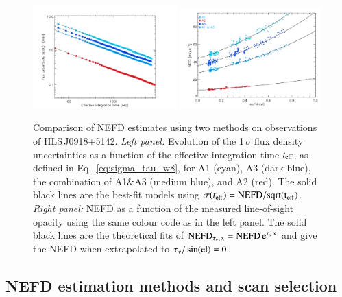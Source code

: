 \documentclass[traditionalabstract]{aa}
\newcommand{\hls}{HLS\,J0918+5142}
\newcommand{\elev}{\rm{el}}
\newcommand{\taunu}{\tau_{\nu}}
\begin{document}
\begin{figure}[!thbp]
  \begin{center}
    \includegraphics[trim={0.5cm, 0, 0, 0.5cm}, clip, angle=0, width=0.495\textwidth]{Figures/hls_nefd_vst-eps-converted-to.pdf}
    \includegraphics[trim={0.5cm, 0, 0.2cm, 0.5cm}, clip, angle=0, width=0.485\textwidth]{Figures/hls_NEFD_vs_TauElev_all-eps-converted-to.pdf}
    \caption{Comparison of NEFD estimates using two methods on observations of
      \hls. \emph{Left panel:} Evolution of the 1\,$\sigma$ flux density
      uncertainties as a function of the effective integration time
      $t_{\rm{eff}}$, as defined in Eq.~\ref{eq:sigma_tau_w8}, for A1
    (cyan), A3 (dark blue), the combination of A1\&A3 (medium blue),
    and A2 (red). The solid black lines are the best-fit models using
    $\sigma(t_{\rm{eff}}) =  \rm{NEFD}/sqrt(t_{\rm{eff}})$. \emph{Right panel:} NEFD as a function of the
    measured line-of-sight opacity using the same colour code as in the
    left panel. The solid black lines are the theoretical
    fits of $\rm{NEFD}_{\taunu,\, x } = \rm{NEFD}\, e^{\taunu\,x}$ and give the
    NEFD when extrapolated to $\taunu/\sin(\elev)= 0$. }
    \label{fig:nefd_twomethods}
  \end{center}
\end{figure}

\subsection{NEFD estimation methods and scan selection}
\label{se:nefd_method}
\end{document}
